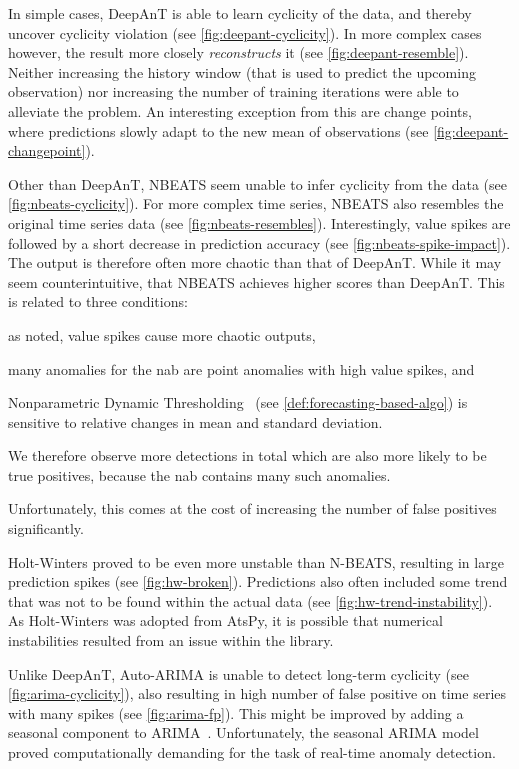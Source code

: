 \begin{description}[style=unboxed,leftmargin=0cm]
    \item[DeepAnT] In simple cases, DeepAnT is able to learn cyclicity of the data,
    and thereby uncover cyclicity violation (see \cref{fig:deepant-cyclicity}).
    In more complex cases however, the result more closely \textit{reconstructs}
    it (see \cref{fig:deepant-resemble}). Neither increasing the history window
    (that is used to predict the upcoming observation) nor increasing the number
    of training iterations were able to alleviate the problem. An interesting
    exception from this are change points, where predictions slowly adapt to the
    new mean of observations (see \cref{fig:deepant-changepoint}).
    \item[NBEATS] Other than DeepAnT, NBEATS seem unable to infer cyclicity from
    the data (see \cref{fig:nbeats-cyclicity}). For more complex time series,
    NBEATS also resembles the original time series data (see \cref{fig:nbeats-resembles}).
    Interestingly, value spikes are followed by a short decrease in prediction
    accuracy (see \cref{fig:nbeats-spike-impact}). The output is therefore often
    more chaotic than that of DeepAnT. While it may seem counterintuitive, that
    NBEATS achieves higher scores than DeepAnT. This is related to three conditions:
    \begin{enumerate*}[a.)]
        \item as noted, value spikes cause more chaotic outputs,
        \item many anomalies for the \gls{nab} are point anomalies with high value spikes, and
        \item Nonparametric Dynamic Thresholding~\cite[cf.][]{Hundman.2018}
        (see \cref{def:forecasting-based-algo}) is sensitive to relative changes
        in mean and standard deviation.
    \end{enumerate*}
    
    We therefore observe more detections in total which are also more likely to
    be true positives, because the \gls{nab} contains many such anomalies.

    Unfortunately, this comes at the cost of increasing the number of false positives
    significantly.
    \item[Holt-Winters] Holt-Winters proved to be even more unstable than N-BEATS,
    resulting in large prediction spikes (see \cref{fig:hw-broken}). Predictions also
    often included some trend that was not to be found within the actual data (see
    \cref{fig:hw-trend-instability}). As Holt-Winters was adopted from AtsPy,
    it is possible that numerical instabilities resulted from an issue within the library.
    \item[Auto-ARIMA] Unlike DeepAnT, Auto-ARIMA is unable to detect long-term
    cyclicity (see \cref{fig:arima-cyclicity}), also resulting in high number of
    false positive on time series with many spikes (see \cref{fig:arima-fp}).
    This might be improved by adding a seasonal component to ARIMA~\cite[cf.][]{Box.2016}.
    Unfortunately, the seasonal ARIMA model proved computationally demanding for
    the task of real-time anomaly detection.


\end{description}
